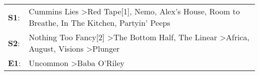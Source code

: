 \begin{supertabular}{p{0.03\textwidth}p{0.92\textwidth}}
 \textbf{S1}:  &               Cummins Lies\textsuperscript{} \textgreater \enspace Red Tape[1]\textsuperscript{}, \enspace Nemo\textsuperscript{}, \enspace Alex's House\textsuperscript{}, \enspace Room to Breathe\textsuperscript{}, \enspace In The Kitchen\textsuperscript{}, \enspace Partyin' Peeps\textsuperscript{}  \enspace  \\
 \textbf{S2}:  &  Nothing Too Fancy[2]\textsuperscript{} \textgreater \enspace The Bottom Half\textsuperscript{}, \enspace The Linear\textsuperscript{} \textgreater \enspace Africa\textsuperscript{}, \enspace August\textsuperscript{}, \enspace Visions\textsuperscript{} \textgreater \enspace Plunger\textsuperscript{}  \enspace  \\
 \textbf{E1}:  &                                                                                                                                                                                                                              Uncommon\textsuperscript{} \textgreater \enspace Baba O'Riley\textsuperscript{}  \enspace  \\
\end{supertabular}
